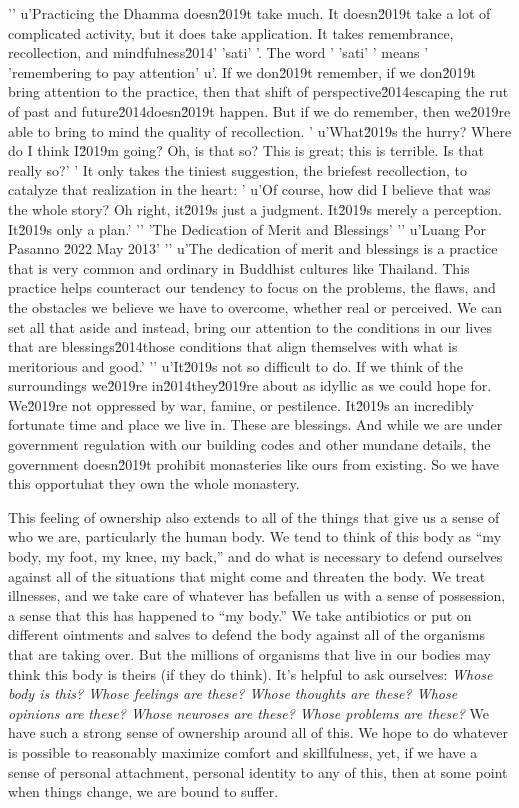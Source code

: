 '\n'
u'Practicing the Dhamma doesn\u2019t take much. It doesn\u2019t take a lot of complicated activity, but it does take application. It takes remembrance, recollection, and mindfulness\u2014'
'sati'
'. The word '
'sati'
' means '
'remembering to pay attention'
u'. If we don\u2019t remember, if we don\u2019t bring attention to the practice, then that shift of perspective\u2014escaping the rut of past and future\u2014doesn\u2019t happen. But if we do remember, then we\u2019re able to bring to mind the quality of recollection. '
u'What\u2019s the hurry? Where do I think I\u2019m going? Oh, is that so? This is great; this is terrible. Is that really so?'
' It only takes the tiniest suggestion, the briefest recollection, to catalyze that realization in the heart: '
u'Of course, how did I believe that was the whole story? Oh right, it\u2019s just a judgment. It\u2019s merely a perception. It\u2019s only a plan.'
'\n'
'The Dedication of Merit and Blessings'
'\n'
u'Luang Por Pasanno \u2022 May 2013'
'\n'
u'The dedication of merit and blessings is a practice that is very common and ordinary in Buddhist cultures like Thailand. This practice helps counteract our tendency to focus on the problems, the flaws, and the obstacles we believe we have to overcome, whether real or perceived. We can set all that aside and instead, bring our attention to the conditions in our lives that are blessings\u2014those conditions that align themselves with what is meritorious and good.'
'\n'
u'It\u2019s not so difficult to do. If we think of the surroundings we\u2019re in\u2014they\u2019re about as idyllic as we could hope for. We\u2019re not oppressed by war, famine, or pestilence. It\u2019s an incredibly fortunate time and place we live in. These are blessings. And while we are under government regulation with our building codes and other mundane details, the government doesn\u2019t prohibit monasteries like ours from existing. So we have this opportuhat they own the 
whole monastery.

This feeling of ownership also extends to all of the things that give 
us a sense of who we are, particularly the human body. We tend to think 
of this body as ``my body, my foot, my knee, my back,'' and do what is 
necessary to defend ourselves against all of the situations that might 
come and threaten the body. We treat illnesses, and we take care of 
whatever has befallen us with a sense of possession, a sense that this 
has happened to ``my body.'' We take antibiotics or put on different 
ointments and salves to defend the body against all of the organisms 
that are taking over. But the millions of organisms that live in our 
bodies may think this body is theirs (if they do think). It's helpful 
to ask ourselves: \emph{Whose body is this? Whose feelings are these? 
Whose thoughts are these? Whose opinions are these? Whose neuroses are 
these? Whose problems are these?} We have such a strong sense of 
ownership around all of this. We hope to do whatever is possible to 
reasonably maximize comfort and skillfulness, yet, if we have a sense 
of personal attachment, personal identity to any of this, then at some 
point when things change, we are bound to suffer.

